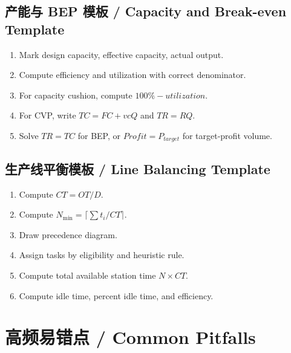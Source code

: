 \documentclass[10pt,a4paper]{ctexart}
\begin{document}
\subsection{产能与 BEP 模板 / Capacity and Break-even Template}
\begin{enumerate}
  \item Mark design capacity, effective capacity, actual output.
  \item Compute efficiency and utilization with correct denominator.
  \item For capacity cushion, compute $100\%-utilization$.
  \item For CVP, write $TC=FC+vcQ$ and $TR=RQ$.
  \item Solve $TR=TC$ for BEP, or $Profit=P_{target}$ for target-profit volume.
\end{enumerate}

\subsection{生产线平衡模板 / Line Balancing Template}
\begin{enumerate}
  \item Compute $CT=OT/D$.
  \item Compute $N_{\min}=\lceil \sum t_i/CT\rceil$.
  \item Draw precedence diagram.
  \item Assign tasks by eligibility and heuristic rule.
  \item Compute total available station time $N\times CT$.
  \item Compute idle time, percent idle time, and efficiency.
\end{enumerate}

\section{高频易错点 / Common Pitfalls}
\label{sec:pitfalls}
\end{document}
